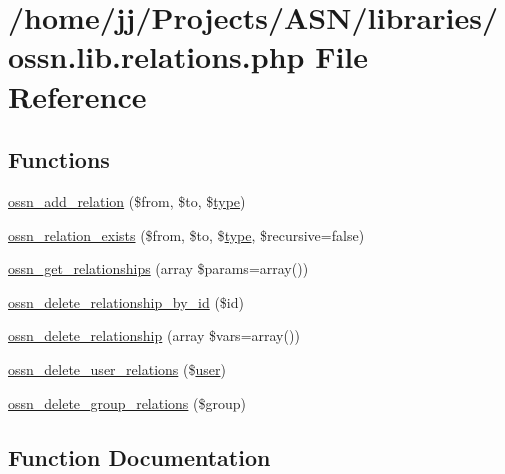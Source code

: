 \hypertarget{ossn_8lib_8relations_8php}{}\section{/home/jj/\+Projects/\+A\+S\+N/libraries/ossn.lib.\+relations.\+php File Reference}
\label{ossn_8lib_8relations_8php}
\subsection*{Functions}
\begin{DoxyCompactItemize}
\item 
\hyperlink{ossn_8lib_8relations_8php_a022f2f307f8500b9bdc2feabbb360e9a}{ossn\+\_\+add\+\_\+relation} (\$from, \$to, \$\hyperlink{_ossn_wall_2actions_2wall_2post_2group_8php_a2dc1bb4e1ed0029daa81ac0776b14b51}{type})
\item 
\hyperlink{ossn_8lib_8relations_8php_afa54670de78f7ee76dc706d8b3a8e07f}{ossn\+\_\+relation\+\_\+exists} (\$from, \$to, \$\hyperlink{_ossn_wall_2actions_2wall_2post_2group_8php_a2dc1bb4e1ed0029daa81ac0776b14b51}{type}, \$recursive=false)
\item 
\hyperlink{ossn_8lib_8relations_8php_a9324205a6fe17e0219201dc3cb7f935e}{ossn\+\_\+get\+\_\+relationships} (array \$params=array())
\item 
\hyperlink{ossn_8lib_8relations_8php_ae2e3b4a6f45ba05d2533ab5a7f57cc34}{ossn\+\_\+delete\+\_\+relationship\+\_\+by\+\_\+id} (\$id)
\item 
\hyperlink{ossn_8lib_8relations_8php_aaa1d8729a602568b3beb522d9c6b4025}{ossn\+\_\+delete\+\_\+relationship} (array \$vars=array())
\item 
\hyperlink{ossn_8lib_8relations_8php_a64eb69922ba19511a395295f3c818d45}{ossn\+\_\+delete\+\_\+user\+\_\+relations} (\$\hyperlink{ossn_8config_8db_8example_8php_a802544b7ba9f79bbf24ef67773d53bed}{user})
\item 
\hyperlink{ossn_8lib_8relations_8php_ad12cf4192e328bf026654b78d787d871}{ossn\+\_\+delete\+\_\+group\+\_\+relations} (\$group)
\end{DoxyCompactItemize}


\subsection{Function Documentation}
